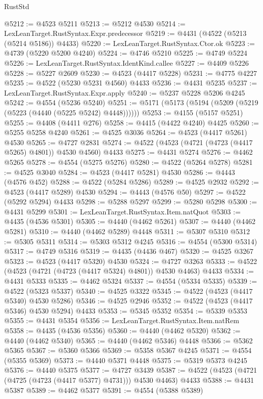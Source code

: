 \begin{lexlean}{RustStd}
\begin{coremodule}
{\begin{coremodule}
{{{{{{{{{{{{{{{{{{{{{{{{{{{{{{{{{{{{{{{{{{{{{{{{{{{{{{{{{{{{@5212 := @4523 @5211
@5213 := @5212 @4530
@5214 := LexLeanTarget.RustSyntax.Expr.predecessor
@5219 := @4431 (@4522 (@5213 (@5214 @5186)) @4433)
@5220 := LexLeanTarget.RustSyntax.Ctor.ok
@5223 := @4739 (@5220 @5200 @4240)
@5224 := @4746 @5210
@5225 := @4749 @5224
@5226 := LexLeanTarget.RustSyntax.IdentKind.callee
@5227 := @4409 @5226
@5228 := @5227 @2609
@5230 := @4523 (@4417 @5228)
@5231 := @4775 @4227
@5235 := @4522 (@5230 @5231 @4560) @4433
@5236 := @4431 @5235
@5237 := LexLeanTarget.RustSyntax.Expr.apply
@5240 := @5237 @5228 @5206 @4245
@5242 := @4554 (@5236 @5240)
@5251 := @5171 (@5173 (@5194 (@5209 (@5219 (@5223 (@4440 (@5225 @5242) @4448))))))
@5253 := @4155 (@5157 @5251)
@5255 := @4408 (@4411 @276)
@5258 := @4415 (@4422 @4240) @4425
@5260 := @5255 @5258 @4240
@5261 := @4525 @3036
@5264 := @4523 (@4417 @5261) @4530
@5265 := @4727 @2831
@5274 := @4522 (@4523 (@4721 (@4723 (@4417 @5265) @4801)) @4530 @4560) @4433
@5275 := @4431 @5274
@5276 := @4462 @5265
@5278 := @4554 (@5275 @5276)
@5280 := @4522 (@5264 @5278)
@5281 := @4525 @3040
@5284 := @4523 (@4417 @5281) @4530
@5286 := @4443 (@4576 @452)
@5288 := @4522 (@5284 @5286)
@5289 := @4525 @2932
@5292 := @4523 (@4417 @5289) @4530
@5294 := @4443 (@4576 @50)
@5297 := @4522 (@5292 @5294) @4433
@5298 := @5288 @5297
@5299 := @5280 @5298
@5300 := @4431 @5299
@5301 := LexLeanTarget.RustSyntax.Item.natQuot
@5303 := @4435 (@4536 @5301)
@5305 := @4440 (@4462 @5261)
@5307 := @4440 (@4462 @5281)
@5310 := @4440 (@4462 @5289) @4448
@5311 := @5307 @5310
@5312 := @5305 @5311
@5314 := @5303 @5312 @4245
@5316 := @4554 (@5300 @5314)
@5317 := @4749 @5316
@5319 := @4435 (@4436 @467)
@5320 := @4525 @3267
@5323 := @4523 (@4417 @5320) @4530
@5324 := @4727 @3263
@5333 := @4522 (@4523 (@4721 (@4723 (@4417 @5324) @4801)) @4530 @4463) @4433
@5334 := @4431 @5333
@5335 := @4462 @5324
@5337 := @4554 (@5334 @5335)
@5339 := @4522 (@5323 @5337)
@5340 := @4525 @3322
@5345 := @4522 (@4523 (@4417 @5340) @4530 @5286)
@5346 := @4525 @2946
@5352 := @4522 (@4523 (@4417 @5346) @4530 @5294) @4433
@5353 := @5345 @5352
@5354 := @5339 @5353
@5355 := @4431 @5354
@5356 := LexLeanTarget.RustSyntax.Item.natRem
@5358 := @4435 (@4536 @5356)
@5360 := @4440 (@4462 @5320)
@5362 := @4440 (@4462 @5340)
@5365 := @4440 (@4462 @5346) @4448
@5366 := @5362 @5365
@5367 := @5360 @5366
@5369 := @5358 @5367 @4245
@5371 := @4554 (@5355 @5369)
@5373 := @4440 @5371 @4448
@5375 := @5319 @5373 @4245
@5376 := @4440 @5375
@5377 := @4727 @3439
@5387 := @4522 (@4523 (@4721 (@4725 (@4723 (@4417 @5377) @4731))) @4530 @4463) @4433
@5388 := @4431 @5387
@5389 := @4462 @5377
@5391 := @4554 (@5388 @5389)
}}}}}}}}}}}}}}}}}}}}}}}}}}}}}}}}}}}}}}}}}}}}}}}}}}}}}}}}}}}}
\end{coremodule}}
\end{coremodule}
\end{lexlean}
